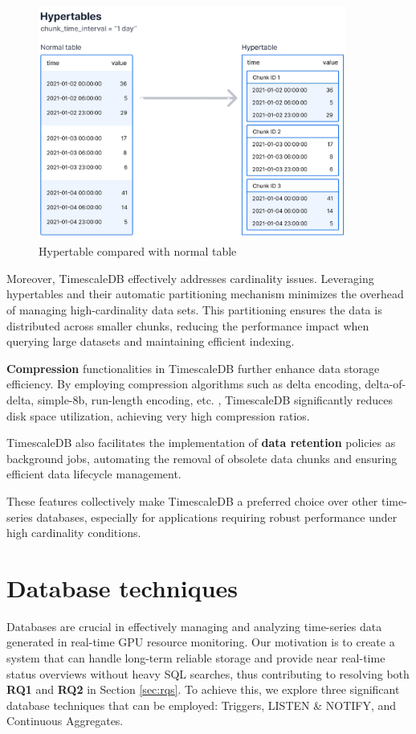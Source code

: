 \begin{figure}[H]
\centering
\includegraphics[width=0.9\textwidth]{figures/hypertables-chunks.png}
\caption{Hypertable compared with normal table \cite{hypertables}}
\label{fig:hypertables-chunks}
\end{figure}

Moreover, TimescaleDB effectively addresses cardinality issues. Leveraging hypertables and their automatic partitioning mechanism minimizes the overhead of managing high-cardinality data sets. This partitioning ensures the data is distributed across smaller chunks, reducing the performance impact when querying large datasets and maintaining efficient indexing.

\textbf{Compression} functionalities in TimescaleDB further enhance data storage efficiency. By employing compression algorithms such as delta encoding, delta-of-delta, simple-8b, run-length encoding, etc. \cite{timescaledb-compress}, TimescaleDB significantly reduces disk space utilization, achieving very high compression ratios.

TimescaleDB also facilitates the implementation of \textbf{data retention} policies as background jobs, automating the removal of obsolete data chunks and ensuring efficient data lifecycle management.

These features collectively make TimescaleDB a preferred choice over other time-series databases, especially for applications requiring robust performance under high cardinality conditions.

\section{Database techniques}
Databases are crucial in effectively managing and analyzing time-series data generated in real-time GPU resource monitoring. Our motivation is to create a system that can handle long-term reliable storage and provide near real-time status overviews without heavy SQL searches, thus contributing to resolving both \textbf{RQ1} and \textbf{RQ2} in Section \ref{sec:rqs}. To achieve this, we explore three significant database techniques that can be employed: Triggers, LISTEN \& NOTIFY, and Continuous Aggregates.

